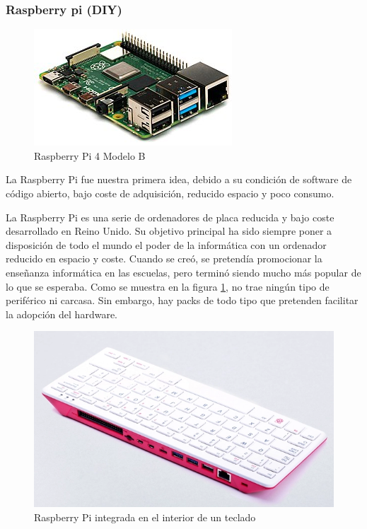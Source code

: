 \subsubsection{Raspberry pi (DIY)}
\begin{figure}[h]
\centering
\includegraphics[scale=0.5]{archivos/RPi_4.jpg}
\caption{Raspberry Pi 4 Modelo B}
\label{fig:rpi4}
\end{figure}
\vspace{1em}
\par La Raspberry Pi fue nuestra primera idea, debido a su condición de software de código abierto, bajo coste de adquisición, reducido espacio y poco consumo.
\par La Raspberry Pi es una serie de ordenadores de placa reducida y bajo coste desarrollado en Reino Unido. Su objetivo principal ha sido siempre poner a disposición de todo el mundo el poder de la informática con un ordenador reducido en espacio y coste. Cuando se creó, se pretendía promocionar la enseñanza informática en las escuelas, pero terminó siendo mucho más popular de lo que se esperaba. Como se muestra en la figura \ref{fig:rpi4}, no trae ningún tipo de periférico ni carcasa. Sin embargo, hay packs de todo tipo que pretenden facilitar la adopción del hardware.
\begin{figure}[h]
\centering
\includegraphics[scale=0.4]{archivos/rpi4keyboard.png}
\caption{Raspberry Pi integrada en el interior de un teclado}
\label{fig:rpi4keyboard}
\end{figure}
